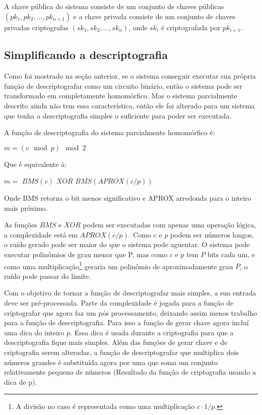 A chave pública do sistema consiste de um conjunto de chaves públicas $(pk_1, pk_2, ..., pk_{n+1})$ e a chave privada consiste de um conjunto de chaves privadas criptografas $(sk_1, sk_2, ..., sk_n)$, onde $sk_i$ é criptografada por $pk_{i+1}$.

\subsection{Simplificando a descriptografia}
Como foi mostrado na seção anterior, se o sistema conseguir executar sua própria função de descriptografar como um circuito binário, então o sistema pode ser transformado em completamente homomórfico.
Mas o sistema parcialmente descrito ainda não tem essa característica, então ele foi alterado para um sistema que tenha a descriptografia simples o suficiente para poder ser executada.
  	
A função de descriptografia do sistema parcialmente homomórfico é:
\begin{center} $m = (c \mod p) \mod 2$ \end{center}
Que é equivalente à:
\begin{center} $m =$ $BMS(c)$ $XOR$ $BMS(APROX(c/p))$ \end{center}
Onde BMS retorna o bit menos significativo e APROX arredonda para o inteiro mais próximo.
  	
As funções $BMS$ e $XOR$ podem ser executadas com apenas uma operação lógica, a complexidade está em $APROX(c/p)$. Como $c$ e $p$ podem ser números longos, o ruído gerado pode ser maior do que o sistema pode aguentar. O sistema pode executar polinômios de grau menor que P, mas como $c$ e $p$ tem $P$ bits cada um, e como uma multiplicação\footnote{A divisão no caso é representada como uma multiplicação $c \cdot 1/p$.} geraria um polinômio de aproximadamente grau $P$, o ruído pode passar do limite.
  	
Com o objetivo de tornar a função de descriptografar mais simples, a sua entrada deve ser pré-processada. Parte da complexidade é jogada para a função de criptografar que agora faz um pós processamento, deixando assim menos trabalho para a função de descriptografia.
Para isso a função de gerar chave agora incluí uma dica do inteiro $p$. Essa dica é usada durante a criptografia para que a descriptografia fique mais simples.
Além das funções de gerar chave e de criptografia serem alteradas, a função de descriptografar que multiplica dois números grandes é substituída agora por uma que soma um conjunto relativamente pequeno de números (Resultado da função de criptografia usando a dica de p).
  	
